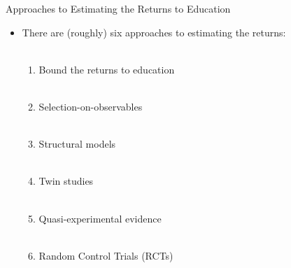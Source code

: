 \documentclass{beamer}
\begin{document}
\begin{frame}[<+->]{Approaches to Estimating the Returns to Education}
\begin{itemize}
\item There are (roughly) six approaches to estimating the returns: \\~\\
	\begin{enumerate}
	\item Bound the returns to education \\~\\
	\item Selection-on-observables \\~\\
	\item Structural models \\~\\
	\item Twin studies \\~\\
	\item Quasi-experimental evidence \\~\\
	\item Random Control Trials (RCTs)
	\end{enumerate}
\end{itemize}
\end{frame}
\end{document}
